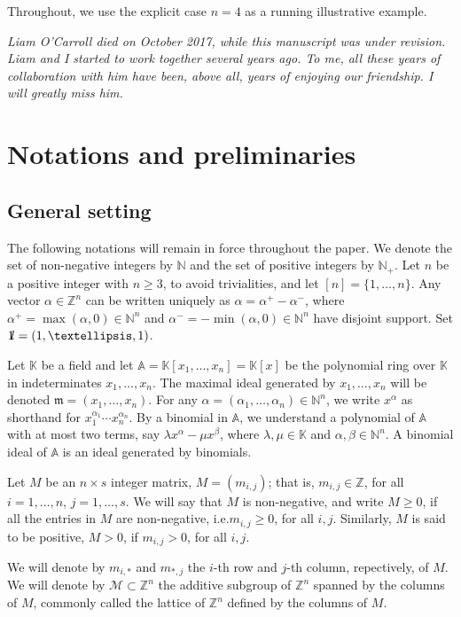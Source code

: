 \documentclass[10pt]{amsart}
\newcommand{\ie}{i.e.}
\newcommand{\mbn}{\mbox{$\mathbb{N}$}}
\newcommand{\mbz}{\mbox{$\mathbb{Z}$}}
\newcommand{\mbk}{\mbox{$\mathbb{K}$}}
\newcommand{\mba}{\mbox{$\mathbb{A}$}}
\newcommand{\mbone}{\mbox{$1\mkern-4.6mu {\rm l}$}}
\newcommand{\mcm}{\mbox{$\mathcal{M}$}}
\newcommand{\mfm}{\mbox{$\mathfrak{m}$}}
\theoremstyle{definition}
\theoremstyle{remark}
\begin{document}
Throughout, we use the explicit case $n=4$ as a running illustrative
example.

\bigskip 

\textit{Liam O'Carroll died on October 2017, while this manuscript was under
revision. Liam and I started to work together several years ago. To
me, all these years of collaboration with him have been, above all,
years of enjoying our friendship. I will greatly miss him.}


\section{Notations and preliminaries}\label{preliminaries}

\subsection{General setting}\label{general}

The following notations will remain in force throughout the paper.  We
denote the set of non-negative integers by $\mbn$ and the set of
positive integers by $\mbn_+$. Let $n$ be a positive integer with
$n\geq 3$, to avoid trivialities, and let $[n]=\{1,\ldots ,n\}$. Any
vector $\alpha\in\mbz^n$ can be written uniquely as
$\alpha=\alpha^+-\alpha^-$, where $\alpha^+=\max(\alpha,0)\in\mbn^n$
and $\alpha^-=-\min(\alpha,0)\in\mbn^n$ have disjoint support. Set
$\mbone=(1,\ldots ,1)$. 

Let $\mbk$ be a field and let $\mba=\mbk[x_1,\ldots ,x_n]=\mbk[x]$ be the
polynomial ring over $\mbk$ in indeterminates $x_1,\ldots ,x_n$. The
maximal ideal generated by $x_1,\ldots ,x_n$ will be denoted
$\mfm=(x_1,\ldots ,x_n)$.  For any $\alpha=(\alpha_1,\ldots
,\alpha_n)\in\mbn^n$, we write $x^\alpha$ as shorthand for
$x_1^{\alpha_1}\cdots x_n^{\alpha_n}$. By a binomial in $\mba$, we
understand a polynomial of $\mba$ with at most two terms, say $\lambda
x^\alpha-\mu x^\beta$, where $\lambda, \mu\in\mbk$ and
$\alpha,\beta\in\mbn^{n}$. A binomial ideal of $\mba$ is an ideal
generated by binomials.

Let $M$ be an $n\times s$ integer matrix, $M=(m_{i,j})$; that is,
$m_{i,j}\in\mbz$, for all $i=1,\ldots ,n$, $j=1,\ldots ,s$. We will
say that $M$ is non-negative, and write $M\geq 0$, if all the entries
in $M$ are non-negative, \ie $m_{i,j}\geq 0$, for all
$i,j$. Similarly, $M$ is said to be positive, $M>0$, if $m_{i,j}>0$,
for all $i,j$.

We will denote by $m_{i,*}$ and $m_{*,j}$ the $i$-th row and $j$-th
column, repectively, of $M$. We will denote by $\mcm\subset \mbz^n$
the additive subgroup of $\mbz^n$ spanned by the columns of $M$,
commonly called the lattice of $\mbz^{n}$ defined by the columns of
$M$.
\end{document}
